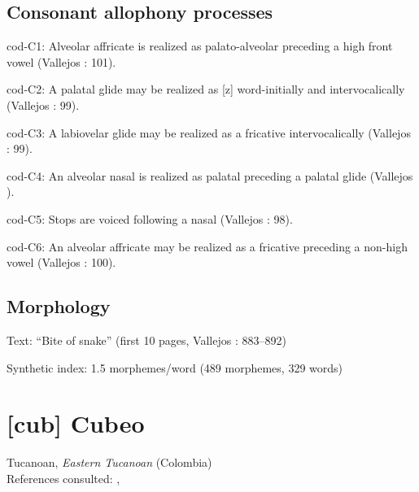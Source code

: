 {\subsection*{Consonant allophony processes}
\begin{appendixdesc}

\item[cod-C1:] Alveolar affricate is realized as palato-alveolar preceding a high front vowel (Vallejos \citealt{Yopán2010}: 101).

\item[cod-C2:] A palatal glide may be realized as [z] word-initially and intervocalically (Vallejos \citealt{Yopán2010}: 99).

\item[cod-C3:] A labiovelar glide may be realized as a fricative intervocalically (Vallejos \citealt{Yopán2010}: 99).

\item[cod-C4:] An alveolar nasal is realized as palatal preceding a palatal glide (Vallejos \citealt{Yopán2010}).

\item[cod-C5:] Stops are voiced following a nasal (Vallejos \citealt{Yopán2010}: 98).

\item[cod-C6:] An alveolar affricate may be realized as a fricative preceding a non-high vowel (Vallejos \citealt{Yopán2010}: 100).
\end{appendixdesc}
\subsection*{Morphology}

\begin{appendixdesc}

\item[Text:] “Bite of snake” (first 10 pages, Vallejos \citealt{Yopán2010}: 883--892)

\item[Synthetic index:] 1.5 morphemes/word (489 morphemes, 329 words)
\end{appendixdesc}
\section*{[cub] Cubeo}  %
Tucanoan, \textit{Eastern Tucanoan} (Colombia)\medskip\\
References consulted: \citet{Chacon2012}, \citet{MorseMaxwell1999}

}
